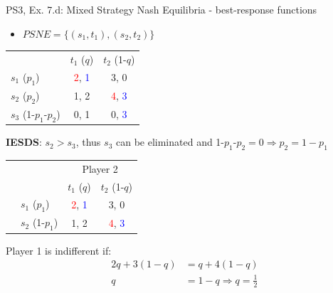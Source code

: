 \begin{frame}{PS3, Ex. 7.d: Mixed Strategy Nash Equilibria - best-response functions}
  \begin{multicols}{2}
    \begin{itemize}
      \item[(d)] $PSNE=\{(s_1,t_1),(s_2,t_2)\}$
    \end{itemize}
    \vspace{-8pt}
    \begin{table}
      \begin{tabular}{l|c|c|}
          \multicolumn{1}{c}{}  & \multicolumn{1}{c}{$t_1$ ($q$)} & \multicolumn{1}{c}{$t_2$ (1-$q$)} \\\cline{2-3}
          $s_1$ ($p_1$)         & \textcolor{red}{2}, \textcolor{blue}{1} & 3, 0 \\\cline{2-3}
          $s_2$ ($p_2$)         & 1, 2 & \textcolor{red}{4}, \textcolor{blue}{3} \\\cline{2-3}
          $s_3$ (1-$p_1$-$p_2$) & 0, 1 & 0, \textcolor{blue}{3} \\\cline{2-3}
      \end{tabular}
    \end{table}
    \vspace{-2pt}
    \textbf{IESDS}: $s_2>s_3$, thus $s_3$ can be eliminated and 1-$p_1$-$p_2=0\Rightarrow p_2=1-p_1$
    \vspace{-6pt}
    \begin{table}
      \begin{tabular}{cl|c|c|}
        & \multicolumn{1}{c}{} & \multicolumn{2}{c}{\color{blue}Player 2}\\
        \parbox[t]{1mm}{}
        &   &  &  \\
        & $s_1$ ($p_1$)  & \textcolor{red}{2}, \textcolor{blue}{1} & 3, 0 \\
        & $s_2$ (1-$p_1$)& 1, 2 & \textcolor{red}{4}, \textcolor{blue}{3} \\
      \end{tabular}
    \end{table}
    Player 1 is indifferent if:
    \begin{align*}
      2q+3(1-q) &= q+4(1-q) \\
      q &= 1-q \Rightarrow q = \frac{1}{2}
    \end{align*}
  \vfill\null \columnbreak
  \vfill\null
  \end{multicols}
\end{frame}
